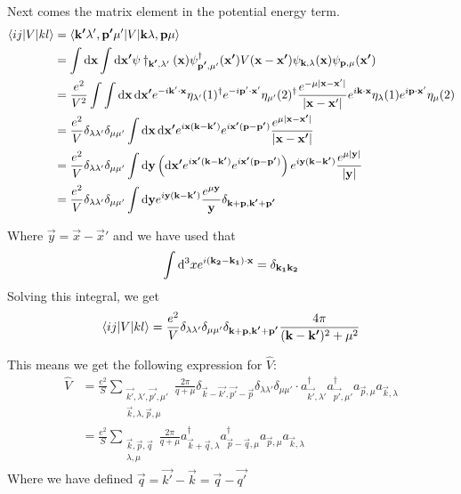 Next comes the matrix element in the potential energy term.
\begin{align*}
\braket[V]{ij}{kl} &= \braket[V]{\vec{k'}\lambda', \vec{p'}\mu'}{\vec{k}\lambda, \vec{p}\mu} \\
&= \int \diff{\vec{x}} \int \diff{\vec{x'}} \psi\dagger_{\vec{k'},\lambda'}(\vec{x})\psi^\dagger_{\vec{p'},\mu'}(\vec{x'})V(\vec{x}- \vec{x'})\psi_{\vec{k},\lambda}(\vec{x})\psi_{\vec{p},\mu}(\vec{x'}) \\
&= \frac{e^2}{V^2} \int \int \diff{\vec{x}}\diff{\vec{x'}}e^{-i \vec{k}'\cdot\vec{x}}\eta_{\lambda'}(1)^\dagger e^{-i \vec{p}'\cdot\vec{x}'}\eta_{\mu'}(2)^\dagger \frac{e^{-\mu|\vec{x}- \vec{x}'|}}{|\vec{x} - \vec{x}'|} e^{i \vec{k}\cdot\vec{x}}\eta_{\lambda}(1)e^{i \vec{p}\cdot\vec{x}'}\eta_{\mu}(2)\\
&= \frac{e^2}{V}\delta_{\lambda\lambda'}\delta_{\mu\mu'}\int \diff{\vec{x}}\diff{\vec{x'}}e^{i \vec{x}(\vec{k}-\vec{k'})}e^{i\vec{x'}(\vec{p}- \vec{p'})}\frac{e^{\mu|\vec{x}- \vec{x'}|}}{|\vec{x}- \vec{x'}|} \\
&= \frac{e^2}{V}\delta_{\lambda\lambda'}\delta_{\mu\mu'}\int \diff{\vec{y}}\left(\diff{\vec{x'}}e^{i \vec{x'}(\vec{k}-\vec{k'})}e^{i\vec{x'}(\vec{p}- \vec{p'})}\right)e^{i\vec{y}(\vec{k}- \vec{k'})}\frac{e^{\mu|\vec{y}|}}{|\vec{y}|} \\
&= \frac{e^2}{V}\delta_{\lambda\lambda'}\delta_{\mu\mu'}\int \diff{\vec{y}}e^{i\vec{y}(\vec{k}- \vec{k'})}\frac{e^{\mu\vec{y}}}{\vec{y}}\delta_{\vec{k}+ \vec{p}, \vec{k'}+ \vec{p'}}
\end{align*}


Where $\vec{y} = \vec{x}- \vec{x}'$ and we have used that
\[ \int \operatorname{d \!}{^3x}e^{i(\bm{\mathrm{k_2}}- \bm{\mathrm{k_1}})\cdot \bm{\mathrm{x}}} = \delta_{\bm{\mathrm{k_1}}\bm{\mathrm{k_2}}} \]
Solving this integral, we get
\[ \braket[V]{ij}{kl} = \frac{e^2}{V}\delta_{\lambda\lambda'}\delta_{\mu\mu'}\delta_{\vec{k}+ \vec{p}, \vec{k'}+ \vec{p'}}\frac{4\pi}{(\vec{k}- \vec{k'})^2 + \mu^2} \]

This means we get the following expression for $\hat{V}$:
\begin{align*}
\hat{V} &= \frac{e^2}{S}\sum_{\substack{\vec{k'},\lambda',\vec{p'},\mu' \\ \vec{k},\lambda,\vec{p},\mu}} \frac{2\pi}{q + \mu}\delta_{\vec{k}- \vec{k'}, \vec{p'}- \vec{p}}\delta_{\lambda\lambda'}\delta_{\mu\mu'} \cdot a_{\vec{k'},\lambda'}^\dagger a_{\vec{p'},\mu'}^\dagger a_{\vec{p},\mu} a_{\vec{k},\lambda} \\
&= \frac{e^2}{S}\sum_{\substack{\vec{k},\vec{p},\vec{q} \\ \lambda, \mu}}\frac{2\pi}{q + \mu}a_{\vec{k}+ \vec{q},\lambda}^\dagger a_{\vec{p}- \vec{q},\mu}^\dagger a_{\vec{p},\mu} a_{\vec{k},\lambda}
\end{align*}
Where we have defined $\vec{q} = \vec{k'}- \vec{k} = \vec{q} - \vec{q'}$

